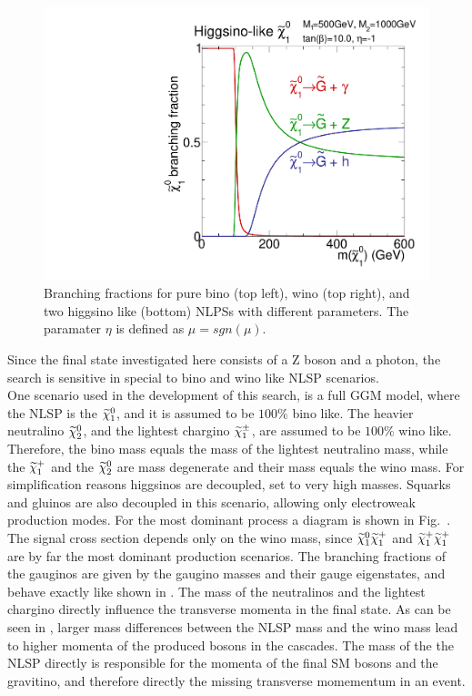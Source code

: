 \begin{figure}[htb]
    \includegraphics[width=\pairwidth]{figures/signal/higgsinoBranching2}
    \caption{Branching fractions for pure bino (top left), wino (top right), and two higgsino like (bottom) NLPSs with different parameters. The paramater $\eta$ is defined as $\mu=sgn(\mu)$.}
    \label{fig:BRNLSP}
\end{figure}
Since the final state investigated here consists of a Z boson and a photon, the search is sensitive in special to bino and wino like NLSP scenarios.\\
One scenario used in the development of this search, is a full GGM model, where the NLSP is the $\widetilde{\chi}^{0}_{1}$, and it is assumed to be $100\%$ bino like. The heavier neutralino $\widetilde{\chi}^{0}_{2}$, and the lightest chargino $\widetilde{\chi}^\pm_{1}$, are assumed to be $100\%$ wino like. Therefore, the bino mass equals the mass of the lightest neutralino mass, while the $\widetilde{\chi}^{+}_{1}$ and the $\widetilde{\chi}^{0}_{2}$ are mass degenerate and their mass equals the wino mass. For simplification reasons higgsinos are decoupled, \ie set to very high masses. Squarks and gluinos are also decoupled in this scenario, allowing only electroweak production modes. For the most dominant process a diagram is shown in Fig.~. The signal cross section depends only on the wino mass, since $\widetilde{\chi}^{0}_{1}\widetilde{\chi}^{+}_{1}$ and $\widetilde{\chi}^{+}_{1}\widetilde{\chi}^{+}_{1}$ are by far the most dominant production scenarios. The branching fractions of the gauginos are given by the gaugino masses and their gauge eigenstates, and behave exactly like shown in . The mass of the neutralinos and the lightest chargino directly influence the transverse momenta in the final state. As can be seen in , larger mass differences between the NLSP mass and the wino mass lead to higher momenta of the produced bosons in the cascades. The mass of the the NLSP directly is responsible for the momenta of the final SM bosons and the gravitino, and therefore directly the missing transverse momementum in an event.\\

